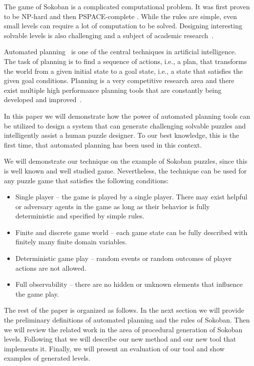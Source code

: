 \documentclass[runningheads]{llncs}
\begin{document}
The game of Sokoban is a complicated computational problem. It was first proven
to be NP-hard \cite{dorit96} and then PSPACE-complete \cite{culberson97}. While
the rules are simple, even small levels can require a lot of computation to be
solved. Designing interesting solvable levels is also challenging and a subject
of academic research~\cite{murase1996automatic,taylor2011procedural,kartal2016data,de2019procedural}.

Automated planning~\cite{TODO} is one of the central techniques in artificial intelligence.
The task of planning is to find a sequence of actions, i.e., a plan, that transforms the world
from a given initial state to a goal state, i.e., a state that satisfies the given goal conditions.
Planning is a very competitive research area and there exist multiple high performance planning
tools that are constantly being developed and improved~\cite{TODO}.

In this paper we will demonstrate how the power of automated planning tools can be utilized
to design a system that can generate challenging solvable puzzles and intelligently assist
a human puzzle designer. To our best knowledge, this is the first time, that automated planning has 
been used in this context.

We will demonstrate our technique on the example of Sokoban puzzles, since this is well known
and well studied game. Nevertheless, the technique can be used for any puzzle game that satisfies
the following conditions:
\begin{itemize}
\item Single player -- the game is played by a single player. There may exist helpful or adversary agents
in the game as long as their behavior is fully deterministic and specified by simple rules.
\item Finite and discrete game world -- each game state can be fully described with finitely many
 finite domain variables.
\item Deterministic game play -- random events or random outcomes of player actions are not allowed.
\item Full observability -- there are no hidden or unknown elements that influence the game play.
\end{itemize}

The rest of the paper is organized as follows. In the next section we will provide the preliminary definitions
of automated planning and the rules of Sokoban. Then we will review the related work in the
area of procedural generation of Sokoban levels. Following that we will describe our new
method and our new tool that implements it. Finally, we will present an evaluation of our tool and show
examples of generated levels.
\end{document}
